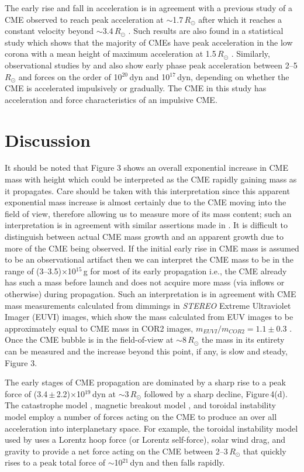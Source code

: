 \documentclass{emulateapj}
\begin{document}
The early rise and fall in acceleration is in agreement with a previous study of a CME observed to reach peak acceleration at $\sim$1.7\,$R_{\odot}$ after which it reaches a constant velocity beyond $\sim$3.4\,$R_{\odot}$ \citep{gallagher03}.  Such results are also found in a statistical study which shows that the majority of CMEs have peak acceleration in the low corona with a mean height of maximum acceleration at 1.5\,$R_{\odot}$ \citep{bein2011}. Similarly, observational studies by \citet{zhang2001} and \citet{zhang2004} also show early phase peak acceleration between 2--5\,$R_{\odot}$ and forces on the order of 10$^{20}$\,dyn and 10$^{17}$\,dyn, depending on whether the CME is accelerated impulsively or gradually. The CME in this study has acceleration and force characteristics of an impulsive CME.


\section{Discussion} \label{bozomath}

It should be noted that Figure 3 shows an overall exponential increase in CME mass with height which could be interpreted as the CME rapidly gaining mass as it propagates. Care should be taken with this interpretation since this apparent exponential mass increase is almost certainly due to the CME moving into the field of view, therefore allowing us to measure more of its mass content; such an interpretation is in agreement with similar assertions made in \citet{vour2010}. 
It is difficult to distinguish between actual CME mass growth and an apparent growth due to more of the CME being observed. If the initial early rise in CME mass
is assumed to be an observational artifact then we can interpret the CME mass to be in the range of (3--3.5)$\times$10$^{15}$\,g for most of its early propagation i.e., the CME already has such a mass before launch and does not acquire more mass (via inflows or otherwise) during propagation. Such an interpretation is in agreement with CME mass measurements calculated from dimmings in \emph{STEREO} Extreme Ultraviolet Imager (EUVI) images, which show the mass calculated from EUV images to be approximately equal to CME mass in COR2 images,  $m_{EUVI}/m_{COR2} =1.1\pm0.3$  \citep{aschw09}. Once the CME bubble is in the field-of-view at $\sim$8\,$R_{\odot}$ the mass in its entirety can be measured and the increase beyond this point, if any, is slow and steady, Figure 3.

The early stages of CME propagation are dominated by a sharp rise to a peak force of (3.4\,$\pm$\,2.2)$\times$10$^{19}$\,dyn at $\sim$3\,$R_{\odot}$ followed by a sharp decline, Figure\,4(d). The catastrophe model \citep{forbes1991,forbes1995,lin2000}, magnetic breakout model \citep{antio99,lynch2008}, and toroidal instability model \citep{chen1996,kleim2006} employ a number of forces acting on the CME to produce an over all acceleration into interplanetary space. For example, the toroidal instability model used by \citet{chen1996} uses a Lorentz hoop force (or Lorentz self-force), solar wind drag, and gravity to provide a net force acting on the CME between 2--3\,$R_{\odot}$ that quickly rises to a peak total force of $\sim$10$^{21}$\,dyn and then falls rapidly.
\end{document}
